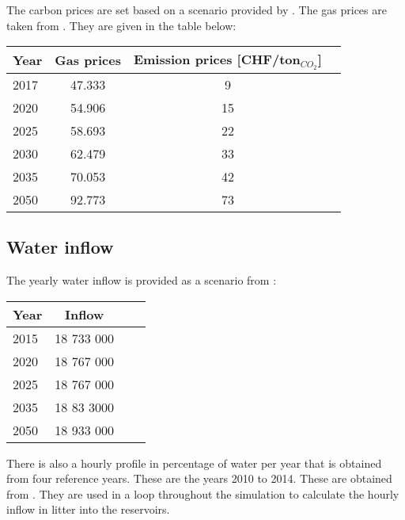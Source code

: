 The carbon prices are set based on a scenario provided by \cite{demiray2018Modellierung}. The gas prices are taken from \cite{NREL2018annual}. They are given in the table below:
			
\begin{center}
\begin{tabular}{ |l|c|c|c| } 
\hline
Year		& Gas prices	& Emission prices [CHF/ton$_{CO_2}$]	\\ \hline \hline
2017		& 47.333		& 9		\\ \hline
2020		& 54.906		& 15		\\ \hline
2025		& 58.693		& 22		\\ \hline
2030		& 62.479		& 33		\\ \hline
2035		& 70.053		& 42		\\ \hline
2050		& 92.773		& 73		\\ \hline
\end{tabular}
\end{center}


\subsection{Water inflow}

The yearly water inflow is provided as a scenario from \cite{vse2012scenarios}:

\begin{center}
\begin{tabular}{ |l|c|c|c| } 
\hline
Year		& Inflow 		\\ \hline \hline
2015		& 18 733 000	\\ \hline
2020		& 18 767 000	\\ \hline
2025		& 18 767 000	\\ \hline
2035		& 18 83 3000	\\ \hline
2050		& 18 933 000	\\ \hline
\end{tabular}
\end{center}

There is also a hourly profile in percentage of water per year that is obtained from four reference years. These are the years 2010 to 2014. These are obtained from \cite{demiray2018Modellierung}. They are used in a loop throughout the simulation to calculate the hourly inflow in litter into the reservoirs.


